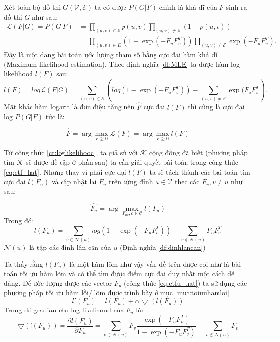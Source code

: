 Xét toàn bộ đồ thị $G(\mathcal{V},\mathcal{E})$ ta có được $P(G|F)$ chính là khả dĩ của $F$ sinh ra đồ thị $G$ như sau:
\begin{equation}
\begin{array}{lll}
	\mathcal{L}(F|G) = P(G|F)
	&= \prod_{(u,v) \in \mathcal{E}}{p(u,v)}\prod_{(u,v) \neq \mathcal{E}}{(1-p(u,v))}\\
	&= \prod_{(u,v) \in E}{(1 - \exp(-F_uF_v^T))}\prod_{(u,v) \neq \mathcal{E}}{\exp(-F_uF_v^T)}.
\end{array}
\end{equation}
Đây là một dang bài toán ước lượng tham số bằng cực đại hàm khả dĩ (Maximum likelihood estimation). Theo định nghĩa \ref{df:MLE} ta được hàm log-likelihood $l(F)$ sau:
\begin{equation}\label{ct:loglikelihood}
	l(F) = log \mathcal{L}(F|G) = \sum_{(u,v) \in \mathcal{E}}{(log(1-\exp(-F_uF_v^T)) - \sum_{(u,v)\neq \mathcal{E}}{\exp(F_uF_v^T})}.
\end{equation}
Mặt khác hàm logarit là đơn điệu tăng nên $\hat{F}$ cực đại $l(F)$ thì cũng là cực đại log $P(G|F)$ tức là:

\begin{equation} \label{eq:ctf_hat}
	\hat{F} = \arg \max_{F \geq 0} \mathcal{L}(F) = \arg \max_{F \geq 0} l(F) 
\end{equation}

Từ công thức \ref{ct:loglikelihood}, ta giả sử với $\mathcal{K}$ cộng đồng đã biết (phương pháp tìm $\mathcal{K}$ sẽ được đề cập ở phần sau) ta cần giải quyết bài toán trong công thức \ref{eq:ctf_hat}. Nhưng thay vì phải cực đại $l(F)$ ta sẽ tách thành các bài toán tìm cực đại $l(F_u)$ và cập nhật lại $F_u$ trên từng đỉnh $u \in \mathcal{V}$ theo các $F_v,v\neq u$ như sau:

\begin{equation}\label{eq:ctfu_hat}
\hat{F_u} = \arg \max_{F_{uc}, c \in \mathcal{C}} l(F_u) 
\end{equation}
Trong đó: 
\begin{equation}\label{eq:ctfu_l}
l(F_u) = \sum_{v \in \mathcal{N}(u)}{log(1 - \exp(-F_u F_v^T))} - \sum_{v \notin \mathcal{N}(u)}{F_uF_v^T}
\end{equation}
$\mathcal{N}(u)$ là tập các đỉnh lân cận của $u$ (Định nghĩa \ref{df:dinhlancan})

Ta thấy rằng $l(F_u)$ là một hàm lõm như vậy vấn đề trên được coi như là bài toán tối ưu hàm lõm và có thể tìm được điểm cực đại duy nhất một cách dễ dàng. Để ước lượng được các vector $F_u$ (công thức \ref{eq:ctfu_hat}) ta sử dụng các phương pháp tối ưu hàm lồi/ lõm được trình bày ở mục \ref{muc:toiuuhamloi}
\begin{equation}\label{eq:gradian}
l'(F_u) = l(F_u)+\alpha \bigtriangledown(l(F_u))
\end{equation}
Trong đó građian cho log-likelihood của $F_u$ là:
\begin{equation}\label{eq:ctfu_l1}
\bigtriangledown(l(F_u))=\dfrac{\partial l(F_u)}{\partial F_u} = \sum_{v \in \mathcal{N}(u)}{F_v \dfrac{\exp(-F_u F_v^T)}{1-\exp(-F_u F_v^T)}} - \sum_{v \notin \mathcal{N}(u)}{F_v}
\end{equation}

